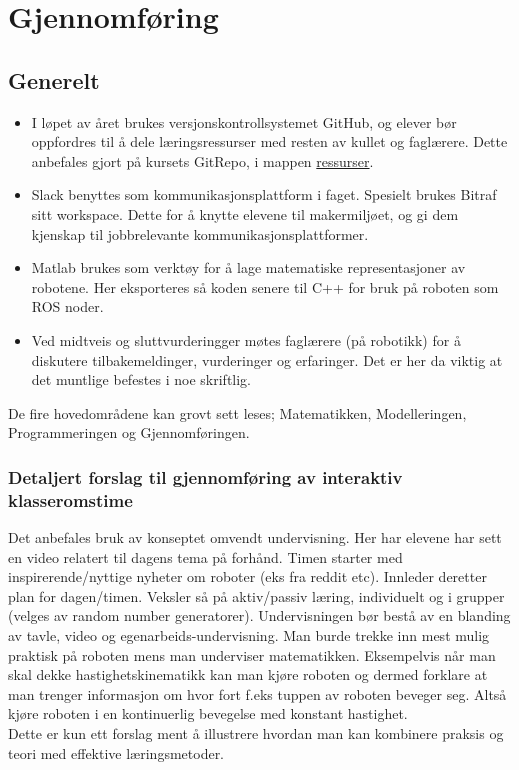 \section{Gjennomføring} \label{Sec: Gjennom}



\subsection{Generelt}

    \begin{itemize}
        \item I løpet av året brukes versjonskontrollsystemet GitHub, og elever bør oppfordres til å dele læringsressurser med resten av kullet og faglærere. Dette anbefales gjort på kursets GitRepo, i mappen \href{https://github.com/KvalheimRacing/KubenRobotics/tree/master/Resources}{ressurser}.
        \item Slack benyttes som kommunikasjonsplattform i faget. Spesielt brukes Bitraf sitt workspace. Dette for å knytte elevene til makermiljøet, og gi dem kjenskap til jobbrelevante kommunikasjonsplattformer.
        \item Matlab brukes som verktøy for å lage matematiske representasjoner av robotene. Her eksporteres så koden senere til C++ for bruk på roboten som ROS noder.
        \item Ved midtveis og sluttvurderingger møtes faglærere (på robotikk) for å diskutere tilbakemeldinger, vurderinger og erfaringer. Det er her da viktig at det muntlige befestes i noe skriftlig.
    \end{itemize}

    De fire hovedområdene kan grovt sett leses; Matematikken, Modelleringen, Programmeringen og Gjennomføringen.

    \subsubsection*{Detaljert forslag til gjennomføring av interaktiv klasseromstime}

        Det anbefales bruk av konseptet omvendt undervisning. Her har elevene har sett en video relatert til dagens tema på forhånd. Timen starter med inspirerende/nyttige nyheter om roboter (eks fra reddit etc).
        Innleder deretter plan for dagen/timen. Veksler så på aktiv/passiv læring, individuelt og i grupper (velges av random number generatorer). Undervisningen bør bestå av en blanding av tavle, video og egenarbeids-undervisning. Man burde trekke inn mest mulig praktisk på roboten mens man underviser matematikken. Eksempelvis når man skal dekke hastighetskinematikk kan man kjøre roboten og dermed forklare at man trenger informasjon om hvor fort f.eks tuppen av roboten beveger seg. Altså kjøre roboten i en kontinuerlig bevegelse med konstant hastighet.\\
        Dette er kun ett forslag ment å illustrere hvordan man kan kombinere praksis og teori med effektive læringsmetoder.



